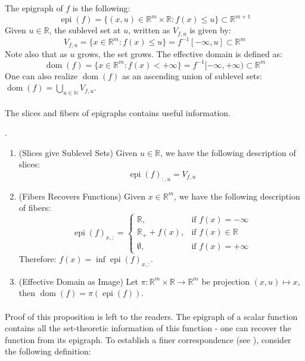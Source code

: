 \begin{defn}
	\label{defn:012-epi-dom-sublvl}
	The epigraph of $f$ is the following:
	\[
		\operatorname{epi}(f)=\{(x,u)\in \mathbb{R}^m\times \mathbb{R}:f(x)\leq u\}\subset \mathbb{R}^{m+1}
	\]
	Given $u\in \mathbb{R}$, the sublevel set at $u$, written as $V_{f,u}$ is given by:
	\[
		V_{f,u}=\{x\in \mathbb{R}^m :f(x)\leq u\}=f^{-1}[-\infty,u]\subset \mathbb{R}^m
	\]
	Note also that as $u$ grows, the set grows.	The effective domain is defined as:
	\[
		\operatorname{dom}(f)=\{x\in \mathbb{R}^m:f(x)<+\infty\}=f^{-1}[-\infty,+\infty)\subset \mathbb{R}^m
	\]
	One can also realize $\operatorname{dom}(f)$ as an ascending union of sublevel sets: $\operatorname{dom}(f)=\bigcup_{u\in \mathbb{N}}V_{f,u}$.
\end{defn}

\paragraph{}The slices and fibers of epigraphs contains useful information.

\begin{prop}
	\label{prop:021-epi-slice-fibers}.
	\begin{enumerate}[label=(\alph*)]
		\item (Slices give Sublevel Sets) Given $u\in \mathbb{R}$, we have the following description of slices:
		      \[
			      \operatorname{epi}(f)_{:,u}=V_{f,u}
		      \]
		\item (Fibers Recovers Functions) Given $x\in \mathbb{R}^m$, we have the following description of fibers:
		      \[
			      \operatorname{epi}(f)_{x,:}=\begin{cases}
				      \mathbb{R},        & \text{if }f(x)=-\infty       \\
				      \mathbb{R}_++f(x), & \text{if }f(x)\in \mathbb{R} \\
				      \emptyset,         & \text{if }f(x)=+\infty
			      \end{cases}
		      \]
		      Therefore: $f(x)=\inf \operatorname{epi}(f)_{x,:}$.
		\item (Effective Domain as Image) Let $\pi:\mathbb{R}^{m}\times \mathbb{R}\to \mathbb{R}^m$ be projection $(x,u)\mapsto x$, then $\operatorname{dom}(f)=\pi(\operatorname{epi}(f))$.
	\end{enumerate}
\end{prop}

\paragraph{}Proof of this proposition is left to the readers. The epigraph of a scalar function contains all the set-theoretic information of this function - one can recover the function from its epigraph. To establish a finer correspondence (see ), consider the following definition:


